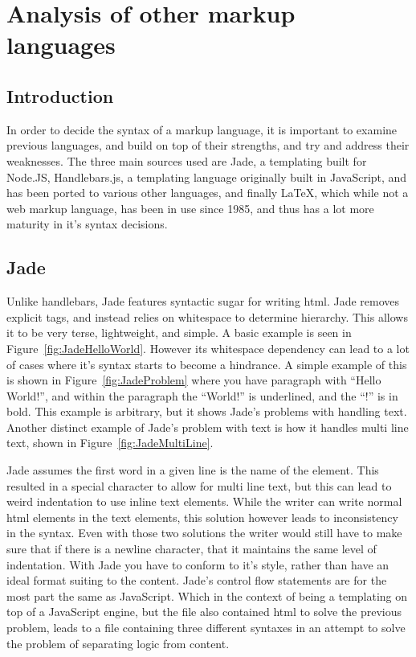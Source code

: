 \section{Analysis of other markup languages}

\subsection{Introduction}

In order to decide the syntax of a  markup language, it is important to examine previous languages, and build on top of their strengths, and try and address their weaknesses. The three main sources used are Jade, a templating built for Node.JS\cite{Jade}, Handlebars.js, a templating language originally built in JavaScript, and has been ported to various other languages, and finally \LaTeX{}, which while not a web markup language, has been in use since 1985\cite{LaTeX}, and thus has a lot more maturity in it's syntax decisions.

\subsection{Jade}

Unlike handlebars, Jade features syntactic sugar for writing html. Jade removes explicit tags, and instead relies on whitespace to determine hierarchy. This allows it to be very terse, lightweight, and simple. A basic example is seen in Figure~\ref{fig:JadeHelloWorld}. However its whitespace dependency can lead to a lot of cases where it's syntax starts to become a hindrance. A simple example of this is shown in Figure~\ref{fig:JadeProblem} where you have paragraph with ``Hello World!'', and within the paragraph the ``World!'' is underlined, and the ``!'' is in bold. This example is arbitrary, but it shows Jade's problems with handling text. Another distinct example of Jade's problem with text is how it handles multi line text, shown in Figure~\ref{fig:JadeMultiLine}. 

Jade assumes the first word in a given line is the name of the element. This resulted in a special character to allow for multi line text, but this can lead to weird indentation to use inline text elements. While the writer can write normal html elements in the text elements, this solution however leads to inconsistency in the syntax. Even with those two solutions the writer would still have to make sure that if there is a newline character, that it maintains the same level of indentation. With Jade you have to conform to it's style, rather than have an ideal format suiting to the content. Jade's control flow statements are for the most part the same as JavaScript. Which in the context of being a templating on top of a JavaScript engine, but the file also contained html to solve the previous problem, leads to a file containing three different syntaxes in an attempt to solve the problem of separating logic from content.

